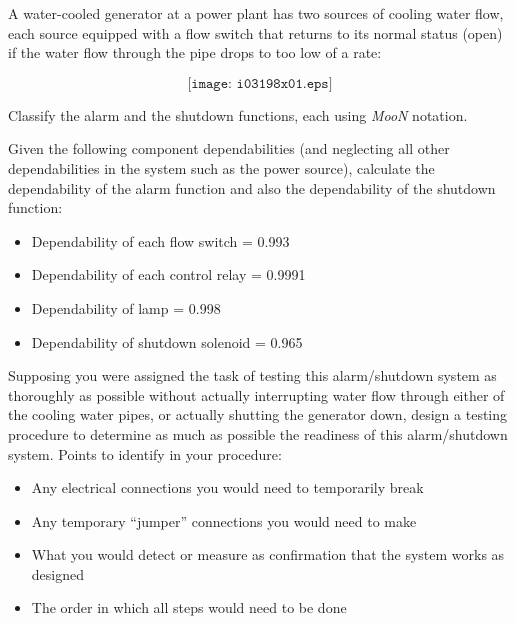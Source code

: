 

A water-cooled generator at a power plant has two sources of cooling water flow, each source equipped with a flow switch that returns to its normal status (open) if the water flow through the pipe drops to too low of a rate:

$$\texttt{[image: i03198x01.eps]}$$

\vskip 10pt

Classify the alarm and the shutdown functions, each using {\it MooN} notation.

\vskip 10pt

Given the following component dependabilities (and neglecting all other dependabilities in the system such as the power source), calculate the dependability of the alarm function and also the dependability of the shutdown function:

\begin{itemize}
\item{} Dependability of each flow switch = 0.993
\item{} Dependability of each control relay = 0.9991
\item{} Dependability of lamp = 0.998
\item{} Dependability of shutdown solenoid = 0.965
\end{itemize}

\vskip 10pt

Supposing you were assigned the task of testing this alarm/shutdown system as thoroughly as possible without actually interrupting water flow through either of the cooling water pipes, or actually shutting the generator down, design a testing procedure to determine as much as possible the readiness of this alarm/shutdown system.  Points to identify in your procedure:

\begin{itemize}
\item{} Any electrical connections you would need to temporarily break
\item{} Any temporary ``jumper'' connections you would need to make
\item{} What you would detect or measure as confirmation that the system works as designed
\item{} The order in which all steps would need to be done
\end{itemize}

